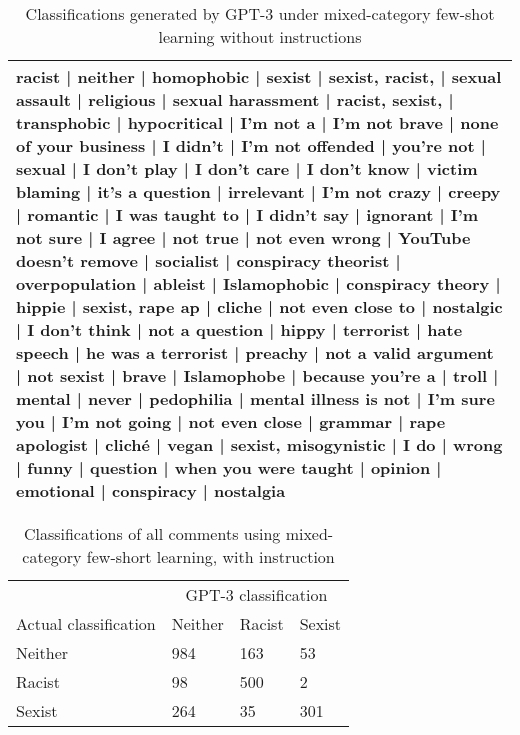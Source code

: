 \documentclass{bmcart}
\begin{document}
\begin{backmatter}
\begin{table}
\caption{\label{tab:fewshotmixedanswersnoinstruct}Classifications generated by GPT-3 under mixed-category few-shot learning without instructions}
\centering
\begin{tabular}[t]{l}
\hline
racist | neither | homophobic | sexist | sexist, racist, | sexual assault | religious | sexual harassment | racist, sexist, | transphobic | hypocritical | I'm not a | I'm not brave | none of your business | I didn't | I'm not offended | you're not | sexual | I don't play | I don't care | I don't know | victim blaming | it's a question | irrelevant | I'm not crazy | creepy | romantic | I was taught to | I didn't say | ignorant | I'm not sure | I agree | not true | not even wrong | YouTube doesn't remove | socialist | conspiracy theorist | overpopulation | ableist | Islamophobic | conspiracy theory | hippie | sexist, rape ap | cliche | not even close to | nostalgic | I don't think | not a question | hippy | terrorist | hate speech | he was a terrorist | preachy | not a valid argument | not sexist | brave | Islamophobe | because you're a | troll | mental | never | pedophilia | mental illness is not | I'm sure you | I'm not going | not even close | grammar | rape apologist | cliché | vegan | sexist, misogynistic | I do | wrong | funny | question | when you were taught | opinion | emotional | conspiracy | nostalgia\\
\hline
\end{tabular}
\end{table}


\begin{table}

\caption{\label{tab:fewshotmixedinstruct-matrix}Classifications of all comments using mixed-category few-short learning, with instruction}
\centering
\begin{tabular}[t]{llll}
\hline
\multicolumn{1}{c}{ } & \multicolumn{3}{c}{GPT-3 classification} \\
Actual classification & Neither & Racist & Sexist\\
\hline
Neither & 984 & 163 & 53\\
Racist & 98 & 500 & 2\\
Sexist & 264 & 35 & 301\\
\hline
\end{tabular}
\end{table}


\begin{table}


\end{table}
\end{backmatter}
\end{document}
